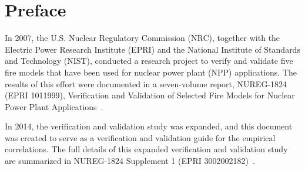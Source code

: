 \documentclass[11pt]{book}
\begin{document}
\begin{minipage}[t][9in][s]{6.25in}


\vspace{3in}

\large
{}

\vfill

\hspace{1in}

\end{minipage}


\clearpage


\pagestyle{plain}

\chapter{Preface}

In 2007, the U.S. Nuclear Regulatory Commission (NRC), together with the Electric Power Research Institute (EPRI) and the National Institute of Standards and Technology (NIST), conducted a research project to verify and validate five fire models that have been used for nuclear power plant (NPP) applications. The results of this effort were documented in a seven-volume report, NUREG-1824 (EPRI 1011999), Verification and Validation of Selected Fire Models for Nuclear Power Plant Applications~\cite{NUREG_1824}.

In 2014, the verification and validation study was expanded, and this document was created to serve as a verification and validation guide for the empirical correlations. The full details of this expanded verification and validation study are summarized in NUREG-1824 Supplement 1 (EPRI 3002002182)~\cite{NUREG_1824_Sup_1}.
\end{document}

